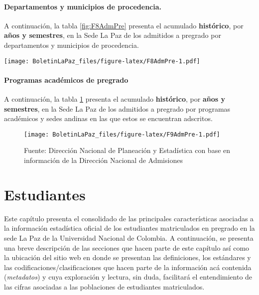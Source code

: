 \documentclass[
]{book}
\begin{document}
\hypertarget{departamentos-y-municipios-de-procedencia.}{%
\subsubsection{Departamentos y municipios de procedencia.}\label{departamentos-y-municipios-de-procedencia.}}

A continuación, la tabla \ref{fig:F8AdmPre} presenta el acumulado \textbf{histórico}, por \textbf{años y semestres}, en la Sede La Paz de los admitidos a pregrado por departamentos y municipios de procedencia.

\texttt{[image: BoletinLaPaz\_files/figure-latex/F8AdmPre-1.pdf]}

\hypertarget{programas-acaduxe9micos-de-pregrado}{%
\subsubsection{Programas académicos de pregrado}\label{programas-acaduxe9micos-de-pregrado}}

A continuación, la tabla \ref{fig:F9AdmPre} presenta el acumulado \textbf{histórico}, por \textbf{años y semestres}, en la Sede La Paz de los admitidos a pregrado por programas académicos y sedes andinas en las que estos se encuentran adscritos.

\begin{figure}
\centering
\texttt{[image: BoletinLaPaz\_files/figure-latex/F9AdmPre-1.pdf]}
\caption{\label{fig:F9AdmPre}Fuente: Dirección Nacional de Planeación y Estadística con base en información de la Dirección Nacional de Admisiones}
\end{figure}

\hypertarget{Estudiantes}{%
\chapter{Estudiantes}\label{Estudiantes}}

Este capítulo presenta el consolidado de las principales características asociadas a la información estadística oficial de los estudiantes matriculados en pregrado en la sede La Paz de la Universidad Nacional de Colombia. A continuación, se presenta una breve descripción de las secciones que hacen parte de este capítulo así como la ubicación del sitio web en donde se presentan las definiciones, los estándares y las codificaciones/clasificaciones que hacen parte de la información acá contenida (\emph{metadatos}) y cuya exploración y lectura, sin duda, facilitará el entendimiento de las cifras asociadas a las poblaciones de estudiantes matriculados.
\end{document}
